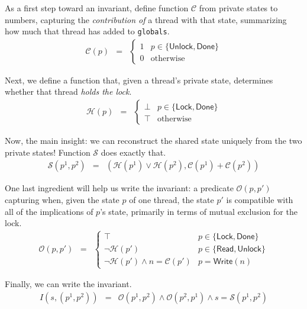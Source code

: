 \documentclass{amsbook}
\theoremstyle{definition}
\theoremstyle{remark}
\numberwithin{section}{chapter}
\numberwithin{equation}{chapter}
\begin{document}
As a first step toward an invariant, define function $\mathcal C$ from private states to numbers, capturing the \emph{contribution of} a thread with that state, summarizing how much that thread has added to \texttt{globals}.
\begin{eqnarray*}
  \mathcal C(p) &=& \begin{cases}
    1 & p \in \{\mathsf{Unlock}, \mathsf{Done}\} \\
    0 & \mathrm{otherwise}
  \end{cases}
\end{eqnarray*}

Next, we define a function that, given a thread's private state, determines whether that thread \emph{holds the lock}.
\begin{eqnarray*}
  \mathcal H(p) &=& \begin{cases}
    \bot & p \in \{\mathsf{Lock}, \mathsf{Done}\} \\
    \top & \mathrm{otherwise}
  \end{cases}
\end{eqnarray*}

Now, the main insight: we can reconstruct the shared state uniquely from the two private states!
Function $\mathcal S$ does exactly that.
\begin{eqnarray*}
  \mathcal S(p^1, p^2) &=& (\mathcal H(p^1) \lor \mathcal H(p^2), \mathcal C(p^1) + \mathcal C(p^2))
\end{eqnarray*}

One last ingredient will help us write the invariant: a predicate $\mathcal O(p, p')$ capturing when, given the state $p$ of one thread, the state $p'$ is compatible with all of the implications of $p$'s state, primarily in terms of mutual exclusion for the lock.
\begin{eqnarray*}
  \mathcal O(p, p') &=& \begin{cases}
    \top & p \in \{\mathsf{Lock}, \mathsf{Done}\} \\
    \neg \mathcal H(p') & p \in \{\mathsf{Read}, \mathsf{Unlock}\} \\
    \neg \mathcal H(p') \land n = \mathcal C(p') & p = \mathsf{Write}(n)
  \end{cases}
\end{eqnarray*}

Finally, we can write the invariant.
\invariants
\begin{eqnarray*}
  I(s, (p^1, p^2)) &=& \mathcal O(p^1, p^2) \land \mathcal O(p^2, p^1) \land s = \mathcal S(p^1, p^2)
\end{eqnarray*}
\end{document}
